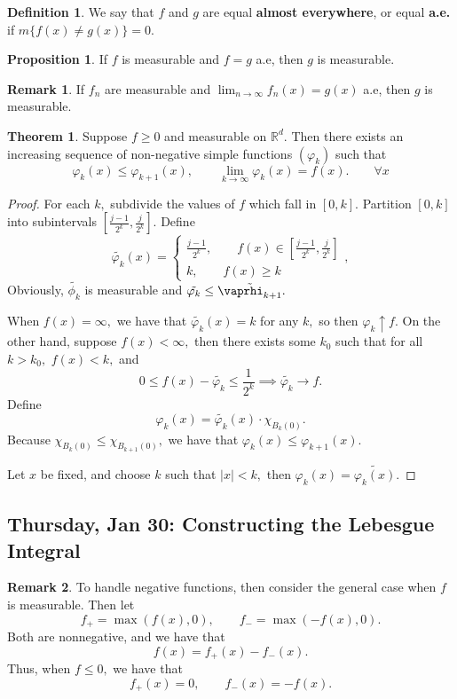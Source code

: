 \documentclass[10pt, oneside]{article}
\newcommand{\bbR}{\mathbb{R}}
\theoremstyle{definition}
\newtheorem{thm}{Theorem}
\newtheorem{defn}{Definition}
\newtheorem{prop}{Proposition}
\newtheorem{rem}{Remark}
\begin{document}
\begin{defn}
    We say that $f$ and $g$ are equal \textbf{almost everywhere}, or equal \textbf{a.e.} if $m\{f(x) \neq g(x)\} = 0.$
\end{defn}
\begin{prop}
    If $f$ is measurable and $f = g$ a.e, then $g$ is measurable.
\end{prop}
\begin{rem}
    If $f_n$ are measurable and $\lim_{n\to \infty}f_n(x) = g(x)$ a.e, then $g$ is measurable. 
\end{rem}

\begin{thm}
    Suppose $f\geq 0$ and measurable on $\bbR^d.$ Then there exists an increasing sequence of non-negative simple functions $(\varphi_k)$ such that 
    \[\varphi_k(x) \leq \varphi_{k+1}(x), \qquad \lim_{k\to \infty} \varphi_k(x) = f(x). \qquad \forall x\]
\end{thm}
\begin{proof}
    For each $k,$ subdivide the values of $f$ which fall in $[0,k].$ Partition $[0,k]$ into subintervals $[\frac{j-1}{2^k}, \frac{j}{2^k}].$ Define 
    \[\tilde{\varphi_k}(x) = \begin{cases}
        \frac{j-1}{2^k}, \qquad f(x)\in [\frac{j-1}{2^k}, \frac{j}{2^k}]\\
        k, \qquad f(x) \geq k
    \end{cases},\]
Obviously, $\tilde{\phi_k}$ is measurable and $\tilde{\varphi_k} \leq \tilde{\vaprhi_{k+1}}.$ 

When $f(x) = \infty,$ we have that $\tilde{\varphi_k}(x) = k$ for any $k,$ so then $\varphi_k \uparrow f.$ On the other hand, suppose $f(x) < \infty,$ then there exists some $k_0$ such that for all $k>k_0,$ $f(x)< k,$ and 
\[0 \leq f(x) - \tilde{\varphi_k} \leq \frac{1}{2^k} \implies \tilde{\varphi_k} \to f.\] Define
\[\varphi_k(x) = \tilde{\varphi_k}(x)\cdot \chi_{B_k(0)}.\] Because $\chi_{B_k(0)}\leq \chi_{B_{k+1}(0)},$ we have that $\varphi_k(x) \leq \varphi_{k+1}(x).$

Let $x$ be fixed, and choose $k$ such that $|x| < k,$ then $\varphi_k(x) = \tilde{\varphi_k(x)}.$
\end{proof}

\newpage
\subsection{Thursday, Jan 30: Constructing the Lebesgue Integral}
\begin{rem}
    To handle negative functions, then consider the general case when $f$ is measurable. Then let 
    \[f_+ = \max(f(x), 0), \qquad f_- = \max(- f(x), 0).\] Both are nonnegative, and we have that 
    \[f(x) = f_+(x) - f_-(x).\]
    Thus, when $f\leq 0,$ we have that 
    \[f_+(x)  =0, \qquad f_-(x) = -f(x).\] 
\end{rem}
\end{document}
